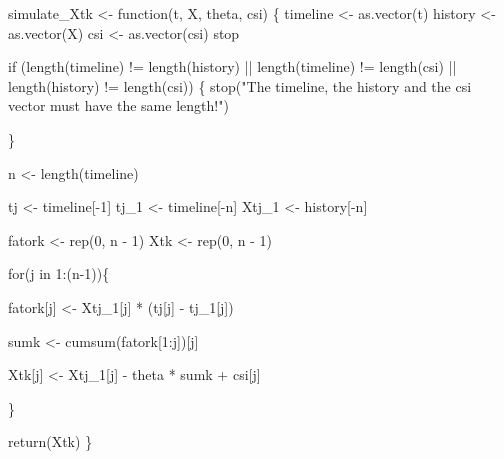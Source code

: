 \documentclass[
  letterpaper,
  DIV=11,
  numbers=noendperiod]{scrreprt}
\newenvironment{Shaded}{\begin{snugshade}}{\end{snugshade}}
\newcommand{\ControlFlowTok}[1]{\textcolor[rgb]{0.00,0.23,0.31}{#1}}
\newcommand{\DecValTok}[1]{\textcolor[rgb]{0.68,0.00,0.00}{#1}}
\newcommand{\FunctionTok}[1]{\textcolor[rgb]{0.28,0.35,0.67}{#1}}
\newcommand{\NormalTok}[1]{\textcolor[rgb]{0.00,0.23,0.31}{#1}}
\newcommand{\OtherTok}[1]{\textcolor[rgb]{0.00,0.23,0.31}{#1}}
\newcommand{\SpecialCharTok}[1]{\textcolor[rgb]{0.37,0.37,0.37}{#1}}
\newcommand{\StringTok}[1]{\textcolor[rgb]{0.13,0.47,0.30}{#1}}
\begin{document}
\begin{Shaded}
\begin{Highlighting}[]
\NormalTok{simulate\_Xtk }\OtherTok{\textless{}{-}} \ControlFlowTok{function}\NormalTok{(t, X, theta, csi) \{}
\NormalTok{    timeline }\OtherTok{\textless{}{-}} \FunctionTok{as.vector}\NormalTok{(t)}
\NormalTok{    history }\OtherTok{\textless{}{-}} \FunctionTok{as.vector}\NormalTok{(X)}
\NormalTok{    csi }\OtherTok{\textless{}{-}} \FunctionTok{as.vector}\NormalTok{(csi)}
\NormalTok{stop}

    \ControlFlowTok{if}\NormalTok{ (}\FunctionTok{length}\NormalTok{(timeline) }\SpecialCharTok{!=} \FunctionTok{length}\NormalTok{(history) }\SpecialCharTok{||}
        \FunctionTok{length}\NormalTok{(timeline) }\SpecialCharTok{!=} \FunctionTok{length}\NormalTok{(csi) }\SpecialCharTok{||}
        \FunctionTok{length}\NormalTok{(history) }\SpecialCharTok{!=} \FunctionTok{length}\NormalTok{(csi)) \{}
        \FunctionTok{stop}\NormalTok{(}\StringTok{"The timeline, the history and the csi vector must have the same length!"}\NormalTok{)}
        
\NormalTok{    \}}

\NormalTok{    n }\OtherTok{\textless{}{-}} \FunctionTok{length}\NormalTok{(timeline)}

\NormalTok{    tj }\OtherTok{\textless{}{-}}\NormalTok{ timeline[}\SpecialCharTok{{-}}\DecValTok{1}\NormalTok{]}
\NormalTok{    tj\_1 }\OtherTok{\textless{}{-}}\NormalTok{ timeline[}\SpecialCharTok{{-}}\NormalTok{n]}
\NormalTok{    Xtj\_1 }\OtherTok{\textless{}{-}}\NormalTok{ history[}\SpecialCharTok{{-}}\NormalTok{n]}
    
\NormalTok{    fatork }\OtherTok{\textless{}{-}} \FunctionTok{rep}\NormalTok{(}\DecValTok{0}\NormalTok{, n }\SpecialCharTok{{-}} \DecValTok{1}\NormalTok{)}
\NormalTok{    Xtk }\OtherTok{\textless{}{-}} \FunctionTok{rep}\NormalTok{(}\DecValTok{0}\NormalTok{, n }\SpecialCharTok{{-}} \DecValTok{1}\NormalTok{)}
    
    
    
    \ControlFlowTok{for}\NormalTok{(j }\ControlFlowTok{in} \DecValTok{1}\SpecialCharTok{:}\NormalTok{(n}\DecValTok{{-}1}\NormalTok{))\{}
      
\NormalTok{    fatork[j] }\OtherTok{\textless{}{-}}\NormalTok{ Xtj\_1[j] }\SpecialCharTok{*}\NormalTok{ (tj[j] }\SpecialCharTok{{-}}\NormalTok{ tj\_1[j])}
    
\NormalTok{    sumk }\OtherTok{\textless{}{-}} \FunctionTok{cumsum}\NormalTok{(fatork[}\DecValTok{1}\SpecialCharTok{:}\NormalTok{j])[j]}

    
\NormalTok{    Xtk[j] }\OtherTok{\textless{}{-}}\NormalTok{ Xtj\_1[j] }\SpecialCharTok{{-}}\NormalTok{ theta }\SpecialCharTok{*}\NormalTok{ sumk }\SpecialCharTok{+}\NormalTok{ csi[j]}
    
 
\NormalTok{    \}}
    
    
    \FunctionTok{return}\NormalTok{(Xtk)}
\NormalTok{\}}
\end{Highlighting}
\end{Shaded}
\end{document}
